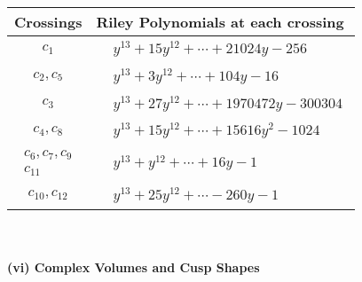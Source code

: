 \documentclass[1p]{elsarticle_modified}
\theoremstyle{definition}
\begin{document}
\begin{tabular}{m{50pt}|m{274pt}}
Crossings & \hspace{64pt}Riley Polynomials at each crossing \\
\hline $$\begin{aligned}c_{1}\end{aligned}$$&$\begin{aligned}
&y^{13}+15 y^{12}+\cdots+21024 y-256
\end{aligned}$\\
\hline $$\begin{aligned}c_{2},c_{5}\end{aligned}$$&$\begin{aligned}
&y^{13}+3 y^{12}+\cdots+104 y-16
\end{aligned}$\\
\hline $$\begin{aligned}c_{3}\end{aligned}$$&$\begin{aligned}
&y^{13}+27 y^{12}+\cdots+1970472 y-300304
\end{aligned}$\\
\hline $$\begin{aligned}c_{4},c_{8}\end{aligned}$$&$\begin{aligned}
&y^{13}+15 y^{12}+\cdots+15616 y^2-1024
\end{aligned}$\\
\hline $$\begin{aligned}c_{6},c_{7},c_{9}\\c_{11}\end{aligned}$$&$\begin{aligned}
&y^{13}+y^{12}+\cdots+16 y-1
\end{aligned}$\\
\hline $$\begin{aligned}c_{10},c_{12}\end{aligned}$$&$\begin{aligned}
&y^{13}+25 y^{12}+\cdots-260 y-1
\end{aligned}$\\
\hline
\end{tabular}\\~\\
\newpage\flushleft \textbf{(vi) Complex Volumes and Cusp Shapes}
\end{document}
